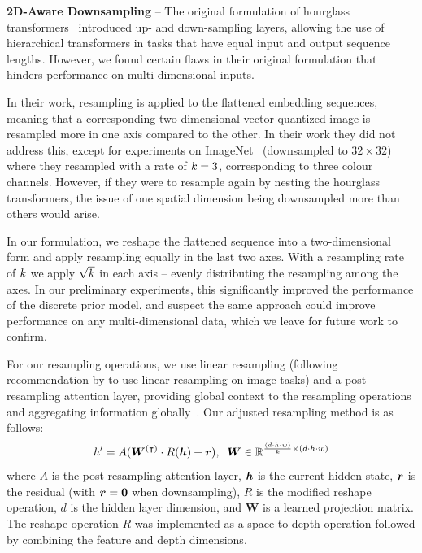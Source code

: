 \textbf{2D-Aware Downsampling} -- The original formulation of hourglass
transformers~\cite{nawrot2021hierarchical} introduced up- and down-sampling
layers, allowing the use of hierarchical transformers in tasks that have equal
input and output sequence lengths. However, we found certain flaws in their
original formulation that hinders performance on multi-dimensional inputs.

In their work, resampling is applied to the flattened embedding sequences,
meaning that a corresponding two-dimensional vector-quantized image is resampled
more in one axis compared to the other. In their work they did not address this,
except for experiments on ImageNet~\cite{russakovsky2015imagenet} (downsampled
to $32 \times 32$) where they
resampled with a rate of $k=3$, corresponding to three colour
channels. However, if they were to resample again by nesting the hourglass
transformers, the issue of one spatial dimension being
downsampled more than others would arise.

In our formulation, we reshape the flattened sequence into a two-dimensional
form and apply resampling equally in the last two axes. With a resampling rate
of $k$ we apply $\sqrt{k}$ in each axis -- evenly
distributing the resampling among the axes. In our preliminary experiments, this
significantly improved the performance of the discrete prior model, and suspect
the same approach could improve performance on any multi-dimensional data, which
we leave for future work to confirm.

For our resampling operations, we use linear resampling (following
recommendation by \cite{nawrot2021hierarchical} to use linear resampling on
image tasks) and a post-resampling attention layer, providing global context to
the resampling operations and aggregating information
globally~\cite{nawrot2021hierarchical}. Our adjusted resampling
method is as follows:
\begin{equation}
    h' = A({\bm{W}}^{(\intercal)} \cdot R({\bm{h}}) + {\bm{r}}), \;\; {\bm{W}} \in
    \mathbb{R}^{\frac{(d \cdot h \cdot w)}{k} \times (d \cdot h \cdot w)}
\end{equation}
where $A$ is the post-resampling attention layer, ${\bm{h}}$ is the current hidden
state, ${\bm{r}}$ is the residual (with ${\bm{r}} = \bm{0}$ when downsampling), $R$ is the
modified reshape operation, $d$ is the hidden layer dimension, and $\textbf{W}$ is a
learned projection matrix. The reshape operation $R$ was implemented as a
space-to-depth operation followed by combining the feature and depth dimensions.

